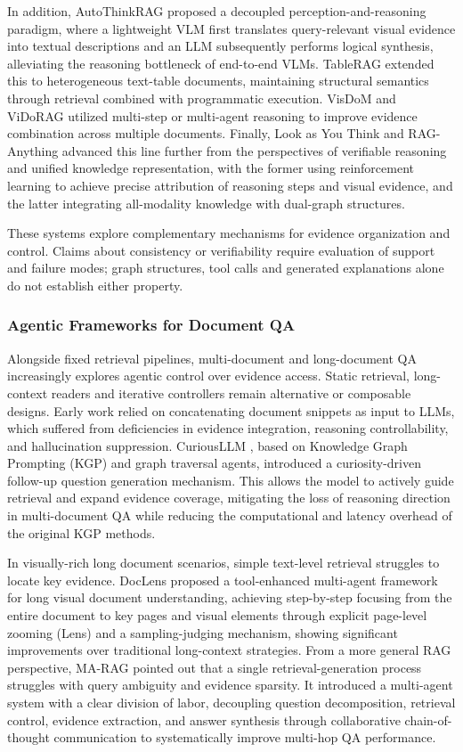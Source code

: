 In addition, AutoThinkRAG proposed a decoupled perception-and-reasoning paradigm, where a lightweight VLM first translates query-relevant visual evidence into textual descriptions and an LLM subsequently performs logical synthesis, alleviating the reasoning bottleneck of end-to-end VLMs. TableRAG \cite{yu2025tablerag} extended this to heterogeneous text-table documents, maintaining structural semantics through retrieval combined with programmatic execution. VisDoM \cite{suri2025visdom} and ViDoRAG \cite{wang2025vidorag} utilized multi-step or multi-agent reasoning to improve evidence combination across multiple documents. Finally, Look as You Think \cite{liu2025look} and RAG-Anything \cite{guo2025rag} advanced this line further from the perspectives of verifiable reasoning and unified knowledge representation, with the former using reinforcement learning to achieve precise attribution of reasoning steps and visual evidence, and the latter integrating all-modality knowledge with dual-graph structures.

These systems explore complementary mechanisms for evidence organization and control. Claims about consistency or verifiability require evaluation of support and failure modes; graph structures, tool calls and generated explanations alone do not establish either property.

\subsubsection{Agentic Frameworks for Document QA}
Alongside fixed retrieval pipelines, multi-document and long-document QA increasingly explores agentic control over evidence access. Static retrieval, long-context readers and iterative controllers remain alternative or composable designs. Early work relied on concatenating document snippets as input to LLMs, which suffered from deficiencies in evidence integration, reasoning controllability, and hallucination suppression. CuriousLLM \cite{yang2025curiousllm}, based on Knowledge Graph Prompting (KGP) and graph traversal agents, introduced a curiosity-driven follow-up question generation mechanism. This allows the model to actively guide retrieval and expand evidence coverage, mitigating the loss of reasoning direction in multi-document QA while reducing the computational and latency overhead of the original KGP methods.

In visually-rich long document scenarios, simple text-level retrieval struggles to locate key evidence. DocLens \cite{zhu2025doclens} proposed a tool-enhanced multi-agent framework for long visual document understanding, achieving step-by-step focusing from the entire document to key pages and visual elements through explicit page-level zooming (Lens) and a sampling-judging mechanism, showing significant improvements over traditional long-context strategies. From a more general RAG perspective, MA-RAG \cite{nguyen2025ma} pointed out that a single retrieval-generation process struggles with query ambiguity and evidence sparsity. It introduced a multi-agent system with a clear division of labor, decoupling question decomposition, retrieval control, evidence extraction, and answer synthesis through collaborative chain-of-thought communication to systematically improve multi-hop QA performance.

